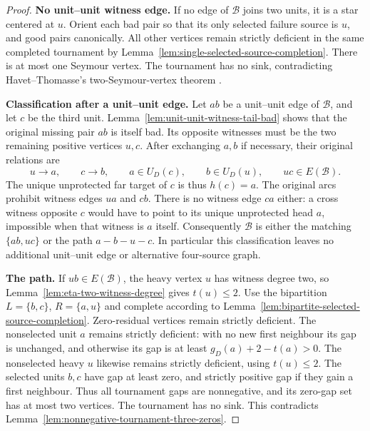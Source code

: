 \begin{proof}
\par\medskip\noindent\textbf{No unit--unit witness edge.}\quad 
If no edge of $\mathcal B$ joins two units, it is a star centered at
$u$. Orient each bad pair so that its only selected failure source
is $u$, and good pairs canonically. All other vertices remain
strictly deficient in the same completed tournament by
Lemma~\ref{lem:single-selected-source-completion}.
There is at most one Seymour vertex. The tournament has no sink,
contradicting Havet--Thomasse's two-Seymour-vertex theorem
\cite[Theorem~2]{HavetThomasse2000}.

\par\medskip\noindent\textbf{Classification after a unit--unit edge.}\quad 
Let $ab$ be a unit--unit edge of $\mathcal B$, and let $c$ be the
third unit. Lemma~\ref{lem:unit-unit-witness-tail-bad} shows that
the original missing pair $ab$ is itself bad.
Its opposite witnesses must be the two remaining positive vertices
$u,c$. After exchanging $a,b$ if necessary, their original relations
are
\begin{equation}\label{eq:2111-original-configuration}
 u\to a,\qquad c\to b,\qquad
 a\in U_D(c),\qquad b\in U_D(u),
 \qquad uc\in E(\mathcal B).
\end{equation}
The unique unprotected far target of $c$ is thus $h(c)=a$.
The original arcs prohibit witness edges $ua$ and $cb$.
There is no witness edge $ca$ either: a cross witness opposite $c$
would have to point to its unique unprotected head $a$, impossible
when that witness is $a$ itself.
Consequently $\mathcal B$ is either the matching
$\{ab,uc\}$ or the path $a-b-u-c$.
In particular this classification leaves no additional unit--unit
edge or alternative four-source graph.

\par\medskip\noindent\textbf{The path.}\quad 
If $ub\in E(\mathcal B)$, the heavy vertex $u$ has witness degree
two, so Lemma~\ref{lem:eta-two-witness-degree} gives $t(u)\le2$.
Use the bipartition $L=\{b,c\}$, $R=\{a,u\}$ and complete according
to Lemma~\ref{lem:bipartite-selected-source-completion}.
Zero-residual vertices remain strictly deficient.
The nonselected unit $a$ remains strictly deficient: with no new first
neighbour its gap is unchanged, and otherwise its gap is at least
$g_D(a)+2-t(a)>0$.
The nonselected heavy $u$ likewise remains strictly deficient,
using $t(u)\le2$.
The selected units $b,c$ have gap at least zero, and strictly positive
gap if they gain a first neighbour.
Thus all tournament gaps are nonnegative, and its zero-gap set has
at most two vertices. The tournament has no sink. This contradicts
Lemma~\ref{lem:nonnegative-tournament-three-zeros}.


\end{proof}
